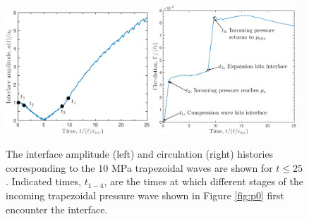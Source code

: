 %
\begin{figure}[h] 
  \centering
  \includegraphics[width=0.48\textwidth]{./figs/lung_figs/trapz10_intf_schematic}
  \includegraphics[width=0.48\textwidth]{./figs/lung_figs/trapz10_circ_schematic}
  \caption[The interface amplitude and circulation histories for the $10$ MPa trapezoidal wave]{The interface amplitude (left) and circulation (right)
    histories corresponding to the $10$ MPa trapezoidal waves are
    shown for $t\leq25$. Indicated times, $t_{1-4}$, are the times at
    which different stages of the incoming trapezoidal pressure wave
    shown in Figure \ref{fig:p0} first encounter the interface.}
  \label{fig:trapz10_circ_interface}
\end{figure}
%
%
